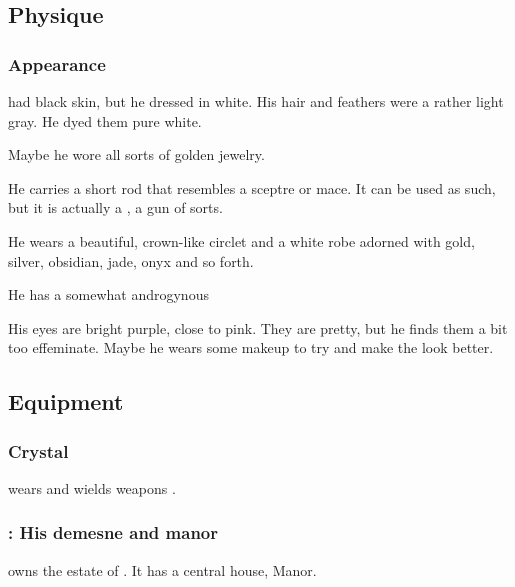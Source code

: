 \subsection{Physique}





\subsubsection{Appearance}
\Teshrial{} had black skin, but he dressed in white.
His hair and feathers were a rather light gray.
He dyed them pure white. 

Maybe he wore all sorts of golden jewelry. 

He carries a short rod that resembles a sceptre or mace. It can be used as such, but it is actually a , a gun of sorts. 

He wears a beautiful, crown-like circlet and a white robe adorned with gold, silver, obsidian, jade, onyx and so forth. 

He has a somewhat androgynous 

His eyes are bright purple, close to pink. 
They are pretty, but he finds them a bit too effeminate. 
Maybe he wears some makeup to try and make the \colour look better. 









\subsection{Equipment}




\subsubsection{Crystal \armour}
\Teshrial{} wears \armour and wields weapons . 





\subsubsection{\Ruishagh: His demesne and manor}
\index{\Ruishagh}
\Teshrial{} owns the estate of \Ruishagh. 
It has a central house, \Ruishagh{} Manor. 





